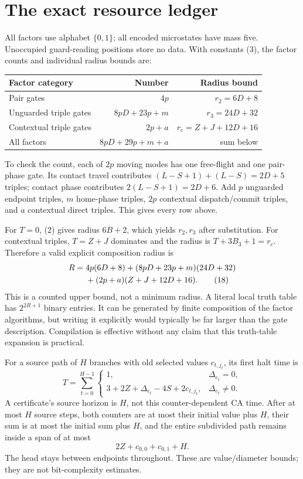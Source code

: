 \documentclass[11pt,a4paper]{article}
\numberwithin{equation}{section}
\begin{document}
\section{The exact resource ledger}\label{fpa:sec:ledger}
All factors use alphabet $\{0,1\}$; all encoded microstates have mass five.
Unoccupied guard-reading positions store no data. With constants (3), the
factor counts and individual radius bounds are:
\begin{center}
\begin{tabular}{lrr}\toprule
Factor category & Number & Radius bound\\\midrule
Pair gates & $4p$ & $r_2=6D+8$\\
Unguarded triple gates & $8pD+23p+m$ & $r_3=24D+32$\\
Contextual triple gates & $2p+a$ & $r_c=Z+J+12D+16$\\\midrule
All factors & $8pD+29p+m+a$ & sum below\\\bottomrule
\end{tabular}
\end{center}
To check the count, each of $2p$ moving modes has one free-flight and one
pair-phase gate. Its contact travel contributes $(L-S+1)+(L-S)=2D+5$
triples; contact phase contributes $2(L-S+1)=2D+6$. Add $p$ unguarded endpoint
triples, $m$ home-phase triples, $2p$ contextual dispatch/commit triples, and
$a$ contextual direct triples. This gives every row above.

For $T=0$, (2) gives radius $6B+2$, which yields $r_2,r_3$ after substitution.
For contextual triples, $T=Z+J$ dominates and the radius is
$T+3B_3+1=r_c$. Therefore a valid explicit composition radius is
\begin{align}
 R={}&4p(6D+8)+(8pD+23p+m)(24D+32)\notag\\
     &+(2p+a)(Z+J+12D+16).                            \tag{18}\label{fpa:eq:radius}
\end{align}
This is a counted upper bound, not a minimum radius. A literal local truth
table has $2^{2R+1}$ binary entries. It can be generated by finite composition
of the factor algorithms, but writing it explicitly would typically be far
larger than the gate description. Compilation is effective without any claim
that this truth-table expansion is practical.

For a source path of $H$ branches with old selected values $c_{t,j_t}$, its
first halt time is
\[
 T=\sum_{t=0}^{H-1}\left\{
 \begin{array}{ll}1,&\Delta_{e_t}=0,\\
 3+2Z+\Delta_{e_t}-4S+2c_{t,j_t},&\Delta_{e_t}\ne0.
 \end{array}\right.                                 \tag{19}\label{fpa:eq:totalclock}
\]
A certificate's source horizon is $H$, not this counter-dependent CA time.
After at most $H$ source steps, both counters are at most their initial value
plus $H$, their sum is at most the initial sum plus $H$, and the entire
subdivided path remains inside a span of at most
\[
                         2Z+c_{0,0}+c_{0,1}+H.       \tag{20}\label{fpa:eq:diameter}
\]
The head stays between endpoints throughout. These are value/diameter bounds;
they are not bit-complexity estimates.
\end{document}

